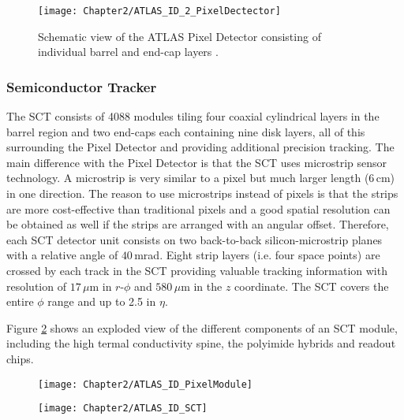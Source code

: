 
\begin{figure}
	\centering
 	 \texttt{[image: Chapter2/ATLAS\_ID\_2\_PixelDectector]}
	 \caption{Schematic view of the ATLAS Pixel Detector consisting of individual barrel and end-cap layers \cite{ATLAS:2008xda}.}
	\label{fig:Chap2:ATLAS:ID_PixelDetector}
\end{figure}



\subsubsection{Semiconductor Tracker}
\label{sec:Chap2:ID:SCT}
The SCT consists of 4088 modules tiling four coaxial cylindrical layers in the barrel region and two end-caps each containing nine disk
layers, all of this surrounding the Pixel Detector and providing additional precision tracking.  The main difference with the Pixel Detector
is that the SCT uses microstrip sensor technology. A microstrip is very similar to a pixel but much larger length ($6\,$cm) in one direction. 
The reason to use microstrips instead of pixels is that the strips are more cost-effective than traditional pixels and a 
good spatial resolution can be obtained as well if the strips are arranged with an angular offset. Therefore, each SCT detector 
unit consists on two back-to-back silicon-microstrip planes with a relative angle of $40\,$mrad.
Eight strip layers (i.e. four space points) are crossed by each track in the SCT providing valuable tracking information with resolution of 
$17\,\mu$m in $r$-$\phi$ and $580\,\mu$m in the $z$ coordinate. The SCT covers the entire $\phi$ range and up to 2.5 in $\eta$.

Figure \ref{fig:Chap2:ATLAS:ID_SCT} shows an exploded view of the different components of an SCT module, including 
the high termal conductivity spine, the polyimide hybrids and readout chips.


\begin{figure}
\centering
\begin{minipage}{.4\textwidth}
	\centering
 	 \texttt{[image: Chapter2/ATLAS\_ID\_PixelModule]}
	\label{fig:Chap2:ATLAS:ID_PixelModule}
\end{minipage}%
\begin{minipage}{.6\textwidth}
	\centering
 	 \texttt{[image: Chapter2/ATLAS\_ID\_SCT]}
	\label{fig:Chap2:ATLAS:ID_SCT}
\end{minipage}
\end{figure}




